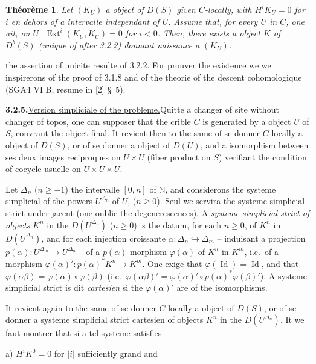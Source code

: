 \documentclass[12pt,a4paper]{article}
\theoremstyle{plain}
\newtheorem{theorem}{Th\'eor\`eme}[section]
\theoremstyle{definition}
\DeclareMathOperator{\Ext}{Ext}
\DeclareMathOperator{\Id}{Id}
\begin{document}
\begin{theorem}\label{thm:3.2.4}
Let $(K_U)$ a object of $D(S)$ given $C$-locally, with $H^i K_U = 0$ for $i$ en dehors of a intervalle independant of $U$. Assume that, for every $U$ in $C$, one ait, on $U$, $\underline{\Ext}^i(K_U, K_U) = 0$ for $i < 0$. Then, there exists a object $K$ of $D^b(S)$ (unique of after 3.2.2) donnant naissance a $(K_U)$.
\end{theorem}

the assertion of unicite resulte of 3.2.2. For prouver the existence we we inspirerons of the proof of 3.1.8 and of the theorie of the descent cohomologique (SGA4 VI B, resume in [2] \S\ 5).

\smallskip
\noindent\textbf{3.2.5.}\quad \underline{Version simpliciale of the probleme.}\quad Quitte a changer of site without changer of topos, one can supposer that the crible $C$ is generated by a object $U$ of $S$, couvrant the object final. It revient then to the same of se donner $C$-locally a object of $D(S)$, or of se donner a object of $D(U)$, and a isomorphism between ses deux images reciproques on $U \times U$ (fiber product on $S$) verifiant the condition of cocycle usuelle on $U \times U \times U$.

Let $\Delta_n$ ($n \geqslant -1$) the intervalle $[0, n]$ of $\mathbb{N}$, and considerons the systeme simplicial of the powers $U^{\Delta_n}$ of $U$, ($n \geqslant 0$). Seul we servira the systeme simplicial strict under-jacent (one oublie the degenerescences). A \emph{systeme simplicial strict of objects} $K^n$ in the $D(U^{\Delta_n})$ ($n \geqslant 0$) is the datum, for each $n \geqslant 0$, of $K^n$ in $D(U^{\Delta_n})$, and for each injection croissante $\alpha : \Delta_n \hookrightarrow \Delta_m$ -- induisant a projection $p(\alpha) : U^{\Delta_m} \to U^{\Delta_n}$ -- of a $p(\alpha)$-morphism $\varphi(\alpha)$ of $K^n$ in $K^m$, i.e.\ of a morphism $\varphi(\alpha)' : p(\alpha)^* K^n \to K^m$. One exige that $\varphi(\Id) = \Id$, and that $\varphi(\alpha\beta) = \varphi(\alpha) \circ \varphi(\beta)$ (i.e.\ $\varphi(\alpha\beta)' = \varphi(\alpha)' \circ p(\alpha)^* \varphi(\beta)'$). A systeme simplicial strict is dit \emph{cartesien} si the $\varphi(\alpha)'$ are of the isomorphisms.

It revient again to the same of se donner $C$-locally a object of $D(S)$, or of se donner a systeme simplicial strict cartesien of objects $K^n$ in the $D(U^{\Delta_n})$. It we faut montrer that si a tel systeme satisfies

a) $H^i K^0 = 0$ for $|i|$ sufficiently grand and
\end{document}
